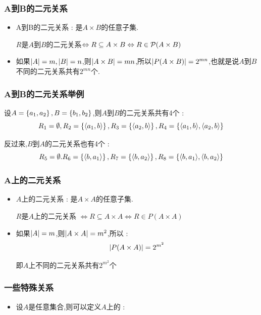 {{{  \subsubsection{A到B的二元关系}{
    \begin{itemize}
      \item {
            A到B的二元关系 : 是$A \times B$的任意子集.

            $R$是$A$到$B$的二元关系$\Leftrightarrow R \subseteq A \times B \Leftrightarrow R \in \operatorname{\mathcal{P}} (A \times B)$
            }
      \item 如果$\left\lvert A \right\vert = m,\left\lvert B \right\vert = n$,则$\left\lvert A \times B \right\vert = mn$,所以$\left\lvert P(A \times B) \right\vert = 2^{mn}$,也就是说$A$到$B$不同的二元关系共有$2^{mn}$个.
    \end{itemize}
  }%

  \subsubsection{A到B的二元关系举例}{
    设$A = \left\{ a_1,a_2 \right\},B = \left\{ b_1,b_2 \right\}$,则$A$到$B$的二元关系共有4个 : $$
      R_1 = \emptyset,R_2 = \left\{ \langle a_1,b\rangle \right\},R_3 = \left\{ \langle a_2,b\rangle \right\},R_4 = \left\{ \langle a_1,b\rangle,\langle a_2,b\rangle \right\}
    $$

    反过来,$B$到$A$的二元关系也有4个 : $$
      R_5 = \emptyset.R_6 = \left\{ \langle b,a_1\rangle \right\},R_7 = \left\{ \langle b,a_2\rangle \right\},R_8 = \left\{ \langle b,a_1\rangle,\langle b,a_2\rangle \right\}
    $$
  }%

  \subsubsection{A上的二元关系}{
    \begin{itemize}
      \item {
            $A$上的二元关系 : 是$A \times A$的任意子集.

            $R$是$A$上的二元关系 $\Leftrightarrow R \subseteq A \times A \Leftrightarrow R \in P(A \times A)$
            }
      \item {
            如果$\left\lvert A \right\vert = m$,则$\left\lvert A \times A \right\vert = m^2$,所以 : $$
              \left\lvert P(A \times A) \right\vert = 2^{m^2}
            $$

            即$A$上不同的二元关系共有$2^{m^2}$个
            }
    \end{itemize}
  }%

  \subsubsection{一些特殊关系}{
    \begin{itemize}
      \item {
            设$A$是任意集合,则可以定义$A$上的 :

}
\end{itemize}}}}}
